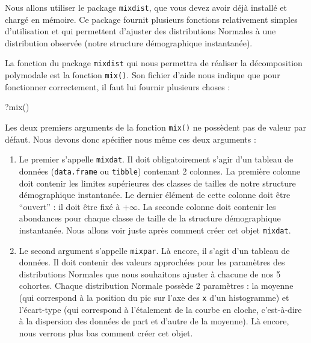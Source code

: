 \documentclass[
  a4paper,
  DIV=11,
  numbers=noendperiod,
  oneside]{scrreprt}
\newenvironment{Shaded}{}{}
\newcommand{\FunctionTok}[1]{\textcolor[rgb]{0.44,0.26,0.76}{#1}}
\newcommand{\NormalTok}[1]{\textcolor[rgb]{0.14,0.16,0.18}{#1}}
\providecommand{\tightlist}{%
  \setlength{\itemsep}{0pt}\setlength{\parskip}{0pt}}\usepackage{longtable,booktabs,array}
\begin{document}
Nous allons utiliser le package \texttt{mixdist}, que vous devez avoir
déjà installé et chargé en mémoire. Ce package fournit plusieurs
fonctions relativement simples d'utilisation et qui permettent d'ajuster
des distributions Normales à une distribution observée (notre structure
démographique instantanée).

La fonction du package \texttt{mixdist} qui nous permettra de réaliser
la décomposition polymodale est la fonction \texttt{mix()}. Son fichier
d'aide nous indique que pour fonctionner correctement, il faut lui
fournir plusieurs choses :

\begin{Shaded}
\begin{Highlighting}[]
\NormalTok{?}\FunctionTok{mix}\NormalTok{()}
\end{Highlighting}
\end{Shaded}


Les deux premiers arguments de la fonction \texttt{mix()} ne possèdent
pas de valeur par défaut. Nous devons donc spécifier nous même ces deux
arguments :

\begin{enumerate}
\def\labelenumi{\arabic{enumi}.}
\tightlist
\item
  Le premier s'appelle \texttt{mixdat}. Il doit obligatoirement s'agir
  d'un tableau de données (\texttt{data.frame} ou \texttt{tibble})
  contenant 2 colonnes. La première colonne doit contenir les limites
  supérieures des classes de tailles de notre structure démographique
  instantanée. Le dernier élément de cette colonne doit être ``ouvert''
  : il doit être fixé à \(+\infty\). La seconde colonne doit contenir
  les abondances pour chaque classe de taille de la structure
  démographique instantanée. Nous allons voir juste après comment créer
  cet objet \texttt{mixdat}.
\item
  Le second argument s'appelle \texttt{mixpar}. Là encore, il s'agit
  d'un tableau de données. Il doit contenir des valeurs approchées pour
  les paramètres des distributions Normales que nous souhaitons ajuster
  à chacune de nos 5 cohortes. Chaque distribution Normale possède 2
  paramètres : la moyenne (qui correspond à la position du pic sur l'axe
  des \texttt{x} d'un histogramme) et l'écart-type (qui correspond à
  l'étalement de la courbe en cloche, c'est-à-dire à la dispersion des
  données de part et d'autre de la moyenne). Là encore, nous verrons
  plus bas comment créer cet objet.
\end{enumerate}
\end{document}

